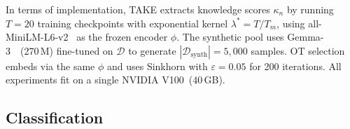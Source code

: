 \begin{foldable} %
  In terms of implementation, TAKE extracts knowledge scores $\kappa_n$ by running $T=20$ training checkpoints with exponential kernel $\lambda^* = T/T_m$, using all-MiniLM-L6-v2~\cite{wang2020minilm} as the frozen encoder $\phi$.
  The synthetic pool uses Gemma-3~\cite{kamath2025gemma}~(270\,M) fine-tuned on $\mathcal{D}$ to generate $|\mathcal{D}_\text{synth}|=5{,}000$ samples.
  \Acl{OT} selection embeds via the same $\phi$ and uses Sinkhorn with $\varepsilon=0.05$ for 200 iterations.
  All experiments fit on a single NVIDIA V100~(40\,GB).
\end{foldable}

\subsection{Classification} \label{sec:54-research03-experiments-results-classification}
